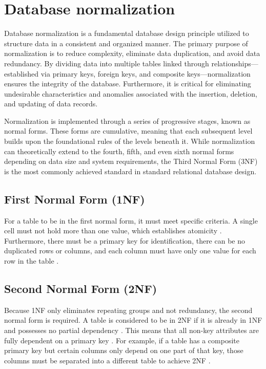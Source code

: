 \documentclass[12pt, a4paper]{report}
\begin{document}
\section{Database normalization}
Database normalization is a fundamental database design principle utilized to structure data in a consistent and organized manner. The primary purpose of normalization is to reduce complexity, eliminate data duplication, and avoid data redundancy. By dividing data into multiple tables linked through relationships—established via primary keys, foreign keys, and composite keys—normalization ensures the integrity of the database. 
Furthermore, it is critical for eliminating undesirable characteristics and anomalies associated with the insertion, deletion, and updating of data records.

Normalization is implemented through a series of progressive stages, known as normal forms. These forms are cumulative, meaning that each subsequent level builds upon the foundational rules of the levels beneath it. While normalization can theoretically extend to the fourth, fifth, and even sixth normal forms depending on data size and system requirements, the Third Normal Form (3NF) is the most commonly achieved standard in standard relational database design. \cite{chris_2022_normalization}

\subsection*{First Normal Form (1NF)}
For a table to be in the first normal form, it must meet specific criteria. A single cell must not hold more than one value, which establishes atomicity . Furthermore, there must be a primary key for identification, there can be no duplicated rows or columns, and each column must have only one value for each row in the table . 

\subsection*{Second Normal Form (2NF)}
Because 1NF only eliminates repeating groups and not redundancy, the second normal form is required. A table is considered to be in 2NF if it is already in 1NF and possesses no partial dependency . This means that all non-key attributes are fully dependent on a primary key . For example, if a table has a composite primary key but certain columns only depend on one part of that key, those columns must be separated into a different table to achieve 2NF .
\end{document}
